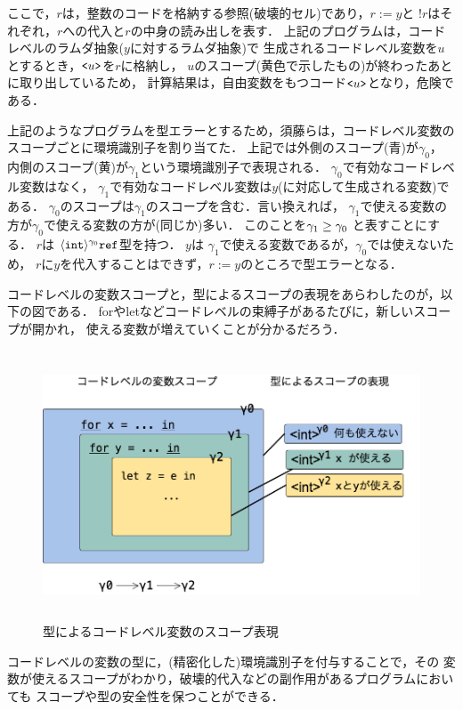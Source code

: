 ここで，$r$は，整数のコードを格納する参照(破壊的セル)であり，$r:=y$と
$!r$はそれぞれ，$r$への代入と$r$の中身の読み出しを表す．
上記のプログラムは，コードレベルのラムダ抽象($y$に対するラムダ抽象)で
生成されるコードレベル変数を$u$とするとき，$\texttt{<}{u}\texttt{>}$を$r$に格納し，
$u$のスコープ(黄色で示したもの)が終わったあとに取り出しているため，
計算結果は，自由変数をもつコード$\texttt{<}{u}\texttt{>}$となり，危険である．

上記のようなプログラムを型エラーとするため，須藤らは，コードレベル変数の
スコープごとに環境識別子を割り当てた．
上記では外側のスコープ(青)が$\gamma_0$，
内側のスコープ(黄)が$\gamma_1$という環境識別子で表現される．
$\gamma_0$で有効なコードレベル変数はなく，
$\gamma_1$で有効なコードレベル変数は$y$(に対応して生成される変数)である．
$\gamma_0$のスコープは$\gamma_1$のスコープを含む．言い換えれば，
$\gamma_1$で使える変数の方が$\gamma_0$で使える変数の方が(同じか)多い．
このことを$\gamma_1 \ge \gamma_0$ と表すことにする．
$r$は $\langle{\mbox{\texttt{int}}}\rangle^{\gamma_0} \mbox{\texttt{ref}}$型を持つ．
$y$は $\gamma_1$で使える変数であるが，$\gamma_0$では使えないため，
$r$に$y$を代入することはできず，$r:=y$のところで型エラーとなる．

コードレベルの変数スコープと，型によるスコープの表現をあらわしたのが，以下の図である．
forやletなどコードレベルの束縛子があるたびに，新しいスコープが開かれ，
使える変数が増えていくことが分かるだろう．

\begin{figure}[ht]
  \centering
  \includegraphics[clip,height=8cm]{./img/ec_for.png}
  \caption{型によるコードレベル変数のスコープ表現}
  \label{fig:ec_for}
\end{figure}

コードレベルの変数の型に，(精密化した)環境識別子を付与することで，その
変数が使えるスコープがわかり，破壊的代入などの副作用があるプログラムにおいても
スコープや型の安全性を保つことができる．

